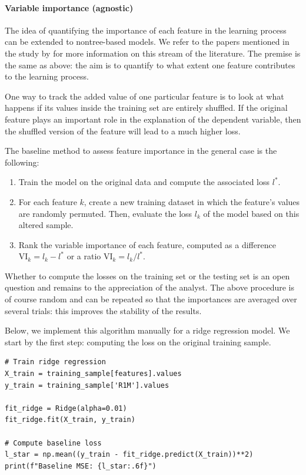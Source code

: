 \paragraph{Variable importance (agnostic)}

The idea of quantifying the importance of each feature in the learning process can be extended to nontree-based models. We refer to the papers mentioned in the study by \cite{fisher2018all} for more information on this stream of the literature. The premise is the same as above: the aim is to quantify to what extent one feature contributes to the learning process.

One way to track the added value of one particular feature is to look at what happens if its values inside the training set are entirely shuffled. If the original feature plays an important role in the explanation of the dependent variable, then the shuffled version of the feature will lead to a much higher loss.

The baseline method to assess feature importance in the general case is the following:

\begin{enumerate}
\item Train the model on the original data and compute the associated loss $l^*$.
\item For each feature $k$, create a new training dataset in which the feature's values are randomly permuted. Then, evaluate the loss $l_k$ of the model based on this altered sample.
\item Rank the variable importance of each feature, computed as a difference $\text{VI}_k=l_k -l^*$ or a ratio $\text{VI}_k=l_k/l^*$.
\end{enumerate}

Whether to compute the losses on the training set or the testing set is an open question and remains to the appreciation of the analyst.
The above procedure is of course random and can be repeated so that the importances are averaged over several trials: this improves the stability of the results.

Below, we implement this algorithm manually for a ridge regression model. We start by the first step: computing the loss on the original training sample.

\begin{verbatim}
# Train ridge regression
X_train = training_sample[features].values
y_train = training_sample['R1M'].values

fit_ridge = Ridge(alpha=0.01)
fit_ridge.fit(X_train, y_train)

# Compute baseline loss
l_star = np.mean((y_train - fit_ridge.predict(X_train))**2)
print(f"Baseline MSE: {l_star:.6f}")
\end{verbatim}

